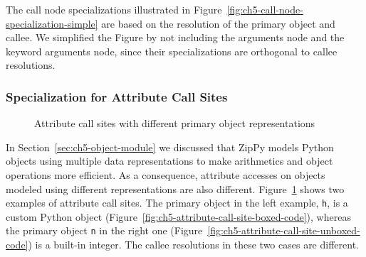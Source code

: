 \begin{enumerate}
\end{enumerate}

The call node specializations illustrated in Figure~\ref{fig:ch5-call-node-specialization-simple} are based on the resolution of the primary object and callee.
We simplified the Figure by not including the arguments node and the keyword arguments node, since their specializations are orthogonal to callee resolutions.

\subsubsection{Specialization for Attribute Call Sites}

\begin{figure}
\centering
{}
\caption{Attribute call sites with different primary object representations}
\label{fig:ch5-attribute-call-site-boxed-unboxed-code}
\end{figure}

In Section~\ref{sec:ch5-object-module} we discussed that ZipPy models Python objects using multiple data representations to make arithmetics and object operations more efficient.
As a consequence, attribute accesses on objects modeled using different representations are also different.
Figure~\ref{fig:ch5-attribute-call-site-boxed-unboxed-code} shows two examples of attribute call sites.
The primary object in the left example, \texttt{h}, is a custom Python object (Figure~\ref{fig:ch5-attribute-call-site-boxed-code}),
whereas the primary object \texttt{n} in the right one (Figure~\ref{fig:ch5-attribute-call-site-unboxed-code}) is a built-in integer.
The callee resolutions in these two cases are different.

